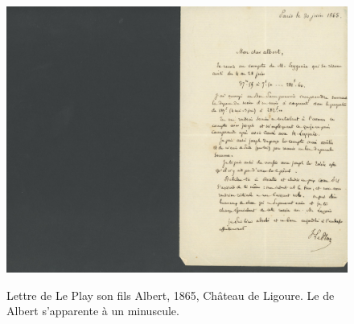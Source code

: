 \begin{figure}[H]
    \centering
    \caption{Lettre de Le Play son fils Albert, 1865, Château de Ligoure. Le  de Albert s'apparente à un  minuscule.}
    \includegraphics[width=16cm]{images/Frédéric à Albert 001.jpg}
    \label{albertLP}
\end{figure}
